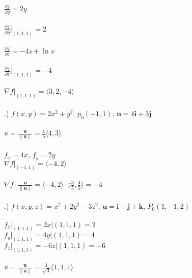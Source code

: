 \documentclass[12pt]{article}
\begin{document}
\noindent $\frac{\partial f}{\partial y} = 2y$\\\\
\noindent $\frac{\partial f}{\partial y}\Big|_{(1, 1, 1)} = 2$\\\\

\noindent $\frac{\partial f}{\partial z} = -4z+\ln{x}$\\\\
\noindent $\frac{\partial f}{\partial z}\Big|_{(1, 1, 1)} = -4$\\\\

\noindent $\nabla f \Big|_{(1,1,1)} = \langle 3, 2, -4\rangle$\\\\

.) $f(x,y) = 2x^{2} + y^{2}$, \hspace{10pt} $p_{0}(-1,1)$, \hspace{10pt} $\mathbf{u} = 4\mathbf{i} + 3\mathbf{j}$\\\\
\noindent $\hat{u} = \frac{\mathbf{u}}{\| \mathbf{u} \|} = \frac{1}{5} \langle 4, 3\rangle$\\\\
\noindent $f_{x} = 4x$, \hspace{10pt} $f_{y} = 2y$\\
\noindent $\nabla f \Big|_{(-1, 1)} = \langle -4, 2\rangle$\\\\
\noindent $\nabla f \cdot \frac{\mathbf{u}}{\| \mathbf{u} \|} = \langle -4, 2\rangle \cdot \langle \frac{3}{5} , \frac{4}{5}\rangle = -4$\\\\
.) $f(x, y, z) = x^{2} + 2y^{2} - 3z^{2}$, \hspace{10pt} $\mathbf{u} = \mathbf{i} + \mathbf{j} + \mathbf{k}$, \hspace{10pt} $P_{0}(1, -1, 2)$\\\\
\noindent $f_{x} \Big|_{(1, 1, 1)} = 2x \Big|{(1, 1, 1)} = 2$\\
\noindent $f_{y} \Big|_{(1, 1, 1)} = 4y \Big|{(1, 1, 1)} = 4$\\
\noindent $f_{z} \Big|_{(1, 1, 1)} = -6z \Big|{(1, 1, 1)} = -6$\\\\
\noindent $\hat{u} =\frac{\mathbf{u}} {\| \mathbf{u} \| } = \frac{1}{\sqrt{3}} \langle 1, 1, 1 \rangle$\\\\
\end{document}
